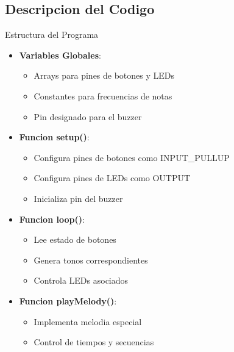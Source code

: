 \subsection{Descripcion del Codigo}
\begin{componentBox}{Estructura del Programa}
	\begin{itemize}[leftmargin=*,itemsep=1pt,parsep=1pt]
		\item \textbf{Variables Globales}:
		\begin{itemize}[itemsep=0pt,parsep=0pt]
			\item Arrays para pines de botones y LEDs
			\item Constantes para frecuencias de notas
			\item Pin designado para el buzzer
		\end{itemize}
		
		\item \textbf{Funcion setup()}:
		\begin{itemize}[itemsep=0pt,parsep=0pt]
			\item Configura pines de botones como INPUT\_PULLUP
			\item Configura pines de LEDs como OUTPUT
			\item Inicializa pin del buzzer
		\end{itemize}
		
		\item \textbf{Funcion loop()}:
		\begin{itemize}[itemsep=0pt,parsep=0pt]
			\item Lee estado de botones
			\item Genera tonos correspondientes
			\item Controla LEDs asociados
		\end{itemize}
		
		\item \textbf{Funcion playMelody()}:
		\begin{itemize}[itemsep=0pt,parsep=0pt]
			\item Implementa melodia especial
			\item Control de tiempos y secuencias
		\end{itemize}
	\end{itemize}
\end{componentBox}

